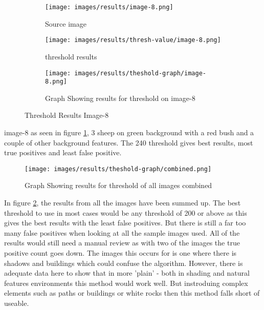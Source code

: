 \begin{figure}[H]
    \centering

\begin{subfigure}{.5\textwidth}
    \centering
    \texttt{[image: images/results/image-8.png]}
    \caption{Source image}

\end{subfigure}%
\begin{subfigure}{.5\textwidth}
\centering
    \texttt{[image: images/results/thresh-value/image-8.png]}
    \caption{threshold results}

\end{subfigure}
\begin{subfigure}{.9\textwidth}
\centering
    \texttt{[image: images/results/theshold-graph/image-8.png]}
    \caption{Graph Showing results for threshold on image-8}
\end{subfigure}%

    \caption{Threshold Results Image-8}
    \label{fig:Threshold-Results-Image-8}
\end{figure}

image-8 as seen in figure \ref{fig:Threshold-Results-Image-8}, 3 sheep on green background with a red bush and a couple of other background features. The 240 threshold gives best results, most true positives and least false positive.


\begin{figure}[H]
    \centering

    \texttt{[image: images/results/theshold-graph/combined.png]}
    \caption{Graph Showing results for threshold of all images combined}
    \label{fig:Threshold-Results-combined}
\end{figure}

In figure \ref{fig:Threshold-Results-combined}, the results from all the images have been summed up. The best threshold to use in most cases would be any threshold of 200 or above as this gives the best results with the least false positives. But there is still a far too many false positives when looking at all the sample images used. All of the results would still need a manual review as with two of the images the true positive count goes down. The images this occurs for is one where there is shadows and buildings which could confuse the algorithm. However, there is adequate data here to show that in more 'plain' - both in shading and natural features environments this method would work well. But instroduing complex elements such as paths or buildings or white rocks then this method falls short of useable.




